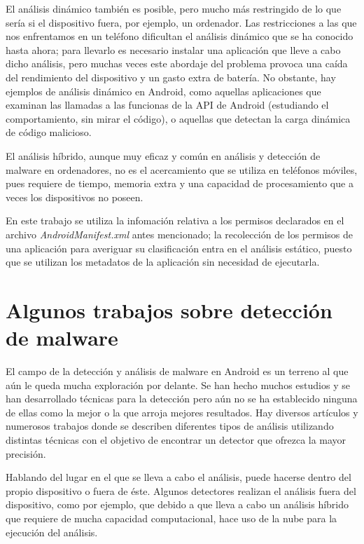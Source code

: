 El análisis dinámico también es posible, pero mucho más restringido de lo que sería si el dispositivo fuera, por ejemplo, un ordenador. Las restricciones a las que nos enfrentamos en un teléfono dificultan el análisis dinámico que se ha conocido hasta ahora; para llevarlo es necesario instalar una aplicación que lleve a cabo dicho análisis, pero muchas veces este abordaje del problema provoca una caída del rendimiento del dispositivo y un gasto extra de batería. No obstante, hay ejemplos de análisis dinámico en Android, como aquellas aplicaciones que examinan las llamadas a las funcionas de la API de Android (estudiando el comportamiento, sin mirar el código), o aquellas que detectan la carga dinámica de código malicioso.

El análisis híbrido, aunque muy eficaz y común en análisis y detección de malware en ordenadores, no es el acercamiento que se utiliza en teléfonos móviles, pues requiere de tiempo, memoria extra y una capacidad de procesamiento que a veces los dispositivos no poseen.

En este trabajo se utiliza la infomación relativa a los permisos declarados en el archivo \textit{AndroidManifest.xml} antes mencionado; la recolección de los permisos de una aplicación para averiguar su clasificación entra en el análisis estático, puesto que se utilizan los metadatos de la aplicación sin necesidad de ejecutarla.

\section{Algunos trabajos sobre detección de malware}

El campo de la detección y análisis de malware en Android es un terreno al que aún le queda mucha exploración por delante. Se han hecho muchos estudios y se han desarrollado técnicas para la detección pero aún no se ha establecido ninguna de ellas como la mejor o la que arroja mejores resultados. Hay diversos artículos y numerosos trabajos donde se describen diferentes tipos de análisis utilizando distintas técnicas con el objetivo de encontrar un detector que ofrezca la mayor precisión.

Hablando del lugar en el que se lleva a cabo el análisis, puede hacerse dentro del propio dispositivo o fuera de éste. Algunos detectores realizan el análisis fuera del dispositivo, como por ejemplo\hypersetup{citecolor=red}\cite{cloud}, que debido a que lleva a cabo un análisis híbrido que requiere de mucha capacidad computacional, hace uso de la nube para la ejecución del análisis.

